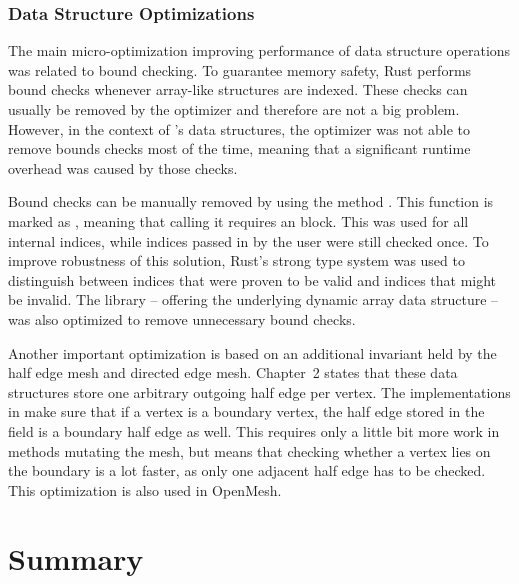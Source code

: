 \subsubsection*{Data Structure Optimizations}

The main micro-optimization improving performance of data structure operations was related to bound checking.
To guarantee memory safety, Rust performs bound checks whenever array-like structures are indexed.
These checks can usually be removed by the optimizer and therefore are not a big problem.
However, in the context of 's data structures, the optimizer was not able to remove bounds checks most of the time, meaning that a significant runtime overhead was caused by those checks.

Bound checks can be manually removed by using the method .
This function is marked as , meaning that calling it requires an  block.
This was used for all internal indices, while indices passed in by the user were still checked once.
To improve robustness of this solution, Rust's strong type system was used to distinguish between indices that were proven to be valid and indices that might be invalid.
The library  -- offering the underlying dynamic array data structure -- was also optimized to remove unnecessary bound checks.

Another important optimization is based on an additional invariant held by the half edge mesh and directed edge mesh.
Chapter~2 states that these data structures store one arbitrary outgoing half edge per vertex.
The implementations in  make sure that if a vertex is a boundary vertex, the half edge stored in the  field is a boundary half edge as well.
This requires only a little bit more work in methods mutating the mesh, but means that checking whether a vertex lies on the boundary is a lot faster, as only one adjacent half edge has to be checked.
This optimization is also used in OpenMesh.


\newpage
\section{Summary}


